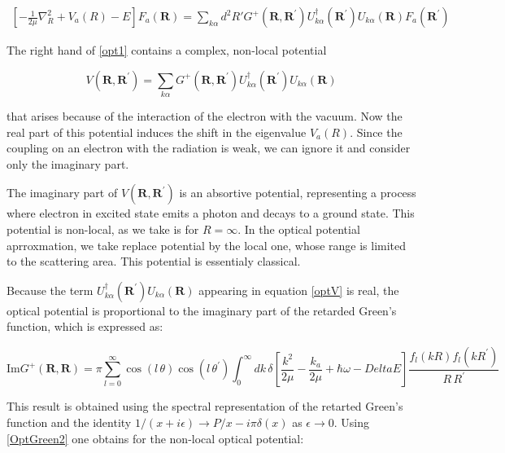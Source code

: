 \begin{equation}\label{opt1}
\begin{split}
\left[-\frac{1}{2\mu}\nabla_R^2 + V_a(R) - E \right]F_a(\mathbf{R}) = \sum_{k\alpha}{d^2R'G^{+}(\mathbf{R},\mathbf{R}^{'})U_{k\alpha}^{\dagger}(\mathbf{R}^{'})U_{k\alpha}(\mathbf{R})F_a(\mathbf{R}^{'})}
\end{split}
\end{equation}

The right hand of \eqref{opt1} contains a complex, non-local potential

\begin{equation}\label{optV}
V(\mathbf{R},\mathbf{R}^{'}) = \sum_{k\alpha}{G^{+}(\mathbf{R},\mathbf{R}^{'})U_{k\alpha}^{\dagger}(\mathbf{R}^{'})U_{k\alpha}(\mathbf{R}) }
\end{equation}

that arises because of the interaction of the electron with the vacuum. Now the real part of this potential induces the shift in the eigenvalue $ V_a(R) $. Since the coupling on an electron with the radiation is weak, we can ignore it and consider only the imaginary part. 

The imaginary part of $ V(\mathbf{R},\mathbf{R}^{'}) $ is an absortive potential, representing a process where electron in excited state emits a photon and decays to a ground state. This potential is non-local, as we take is for $ R = \infty $. In the optical potential aprroxmation, we take replace potential by the local one, whose range is limited to the scattering area. This potential is essentialy classical.

Because the term $ U_{k\alpha}^{\dagger}(\mathbf{R}^{'})U_{k\alpha}(\mathbf{R}) $ appearing in equation \eqref{optV} is real, the optical potential is proportional to the imaginary part of the retarded Green's function, which is expressed as:

\begin{equation}\label{OptGreen2}
\text{Im} G^{+}(\mathbf{R},\mathbf{R}) = \pi\sum_{l=0}^{\infty}{\cos(l\, \theta)\cos(l\,\theta^{'})\int_0^{\infty}{dk\,\delta\left[\frac{k^2}{2\mu} - \frac{k_a}{2\mu} + \hbar\omega - Delta E \right]\frac{f_l(kR)f_l(kR^{'})}{R\,R^{'}} }  }
\end{equation}

This result is obtained using the spectral representation of the retarted Green's function and the identity $ 1/(x + i\epsilon) \rightarrow P/x - i\pi\delta(x) $ as $ \epsilon \rightarrow 0 $. Using \eqref{OptGreen2} one obtains for the non-local optical potential:

